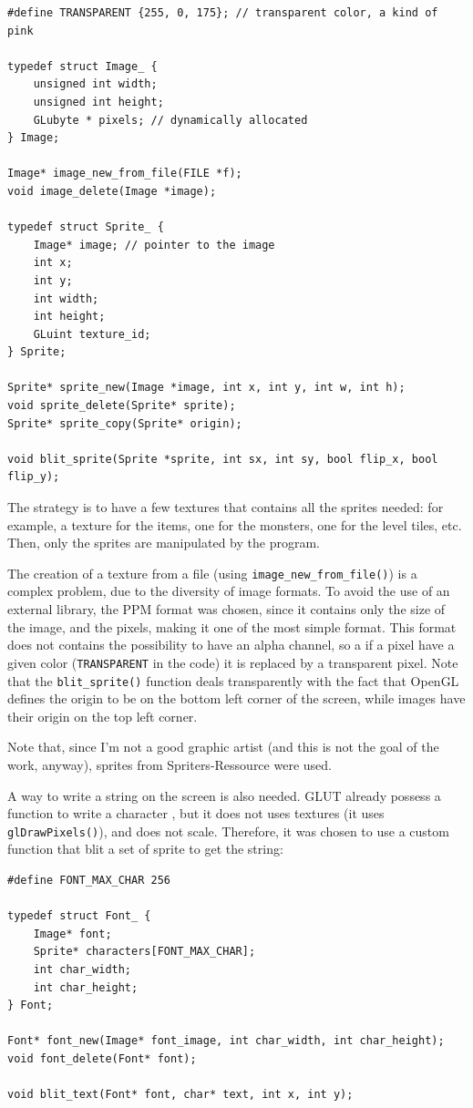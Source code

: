 \documentclass[12pt,a4paper]{article}
\newcommand{\cc}[1]{\texttt{#1}}
\begin{document}
\begin{verbatim}
#define TRANSPARENT {255, 0, 175}; // transparent color, a kind of pink

typedef struct Image_ {
	unsigned int width;
	unsigned int height;
	GLubyte * pixels; // dynamically allocated
} Image;

Image* image_new_from_file(FILE *f);
void image_delete(Image *image);

typedef struct Sprite_ {
	Image* image; // pointer to the image
	int x;
	int y;
	int width;
	int height;
	GLuint texture_id;
} Sprite;

Sprite* sprite_new(Image *image, int x, int y, int w, int h);
void sprite_delete(Sprite* sprite);
Sprite* sprite_copy(Sprite* origin);

void blit_sprite(Sprite *sprite, int sx, int sy, bool flip_x, bool flip_y);
\end{verbatim}

The strategy is to have a few textures that contains all the sprites needed: for example, a texture for the items, one for the monsters, one for the level tiles, etc. Then, only the sprites are manipulated by the program.

The creation of a texture from a file (using \cc{image_new_from_file()}) is a complex problem, due to the diversity of image formats. To avoid the use of an external library, the PPM format \cite{ppmformat} was chosen, since it contains only the size of the image, and the pixels, making it one of the most simple format. This format does not contains the possibility to have an alpha channel, so a if a pixel have a given color (\cc{TRANSPARENT} in the code) it is replaced by a transparent pixel. Note that the \cc{blit_sprite()} function deals transparently with the fact that OpenGL defines the origin to be on the bottom left corner of the screen, while images have their origin on the top left corner. 

Note that, since I'm not a good graphic artist (and this is not the goal of the work, anyway), sprites from Spriters-Ressource \cite{spriters} were used.

A way to write a string on the screen is also needed. GLUT already possess a function to write a character \cite{glutrefchar}, but it does not uses textures (it uses \cc{glDrawPixels()}), and does not scale. Therefore, it was chosen to use a custom function that blit a set of sprite to get the string:

\begin{verbatim}
#define FONT_MAX_CHAR 256

typedef struct Font_ {
	Image* font;
	Sprite* characters[FONT_MAX_CHAR];
    int char_width;
    int char_height;
} Font;

Font* font_new(Image* font_image, int char_width, int char_height);
void font_delete(Font* font);

void blit_text(Font* font, char* text, int x, int y);
\end{verbatim}
\end{document}
